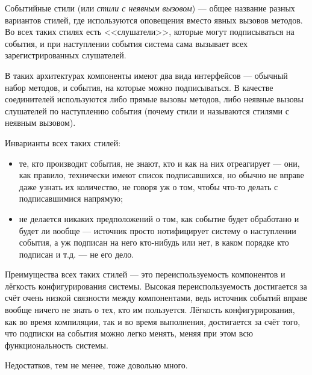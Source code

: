\documentclass[a5paper]{article}
\begin{document}
Событийные стили (или \emph{стили с неявным вызовом}) --- общее название разных вариантов стилей, где используются оповещения вместо явных вызовов методов. Во всех таких стилях есть <<слушатели>>, которые могут подписываться на события, и при наступлении события система сама вызывает всех зарегистрированных слушателей.

В таких архитектурах компоненты имеют два вида интерфейсов --- обычный набор методов, и события, на которые можно подписываться. В качестве соединителей используются либо прямые вызовы методов, либо неявные вызовы слушателей по наступлению события (почему стили и называются стилями с неявным вызовом).

Инварианты всех таких стилей:

\begin{itemize}
    \item те, кто производит события, не знают, кто и как на них отреагирует --- они, как правило, технически имеют список подписавшихся, но обычно не вправе даже узнать их количество, не говоря уж о том, чтобы что-то делать с подписавшимися напрямую;
    \item не делается никаких предположений о том, как событие будет обработано и будет ли вообще --- источник просто нотифицирует систему о наступлении события, а уж подписан на него кто-нибудь или нет, в каком порядке кто подписан и т.д. --- не его дело.
\end{itemize}

Преимущества всех таких стилей --- это переиспользуемость компонентов и лёгкость конфигурирования системы. Высокая переиспользуемость достигается за счёт очень низкой связности между компонентами, ведь источник событий вправе вообще ничего не знать о тех, кто им пользуется. Лёгкость конфигурирования, как во время компиляции, так и во время выполнения, достигается за счёт того, что подписки на события можно легко менять, меняя при этом всю функциональность системы.

Недостатков, тем не менее, тоже довольно много.
\end{document}
